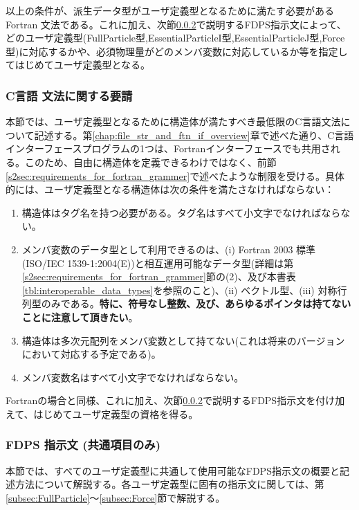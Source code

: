 以上の条件が、派生データ型がユーザ定義型となるために満たす必要があるFortran 文法である。これに加え、次節\ref{subsubsec:FDPS_directives}で説明するFDPS指示文によって、どのユーザ定義型(FullParticle型,EssentialParticleI型,EssentialParticleJ型,Force型)に対応するかや、必須物理量がどのメンバ変数に対応しているか等を指定してはじめてユーザ定義型となる。

\subsubsection{C言語 文法に関する要請}
\label{s2sec:requirements_for_c_grammer}
本節では、ユーザ定義型となるために構造体が満たすべき最低限のC言語文法について記述する。第\ref{chap:file_str_and_ftn_if_overview}章で述べた通り、C言語インターフェースプログラムの1つは、Fortranインターフェースでも共用される。このため、自由に構造体を定義できるわけではなく、前節\ref{s2sec:requirements_for_fortran_grammer}で述べたような制限を受ける。具体的には、ユーザ定義型となる構造体は次の条件を満たさなければならない：
\begin{enumerate}[leftmargin=*,itemsep=-1ex,label=(\arabic*)]
\item 構造体はタグ名を持つ必要がある。タグ名はすべて小文字でなければならない。
\item メンバ変数のデータ型として利用できるのは、(i) Fortran 2003 標準(ISO/IEC 1539-1:2004(E))と相互運用可能なデータ型(詳細は第\ref{s2sec:requirements_for_fortran_grammer}節の(2)、及び本書表\ref{tbl:interoperable_data_types}を参照のこと)、(ii) ベクトル型、(iii) 対称行列型のみである。\textbf{特に、符号なし整数、及び、あらゆるポインタは持てないことに注意して頂きたい}。
\item 構造体は多次元配列をメンバ変数として持てない(これは将来のバージョンにおいて対応する予定である)。
\item メンバ変数名はすべて小文字でなければならない。
\end{enumerate}

Fortranの場合と同様、これに加え、次節\ref{subsubsec:FDPS_directives}で説明するFDPS指示文を付け加えて、はじめてユーザ定義型の資格を得る。

\subsubsection{FDPS 指示文 (共通項目のみ)}
\label{subsubsec:FDPS_directives}
本節では、すべてのユーザ定義型に共通して使用可能なFDPS指示文の概要と記述方法について解説する。各ユーザ定義型に固有の指示文に関しては、第\ref{subsec:FullParticle}〜\ref{subsec:Force}節で解説する。

